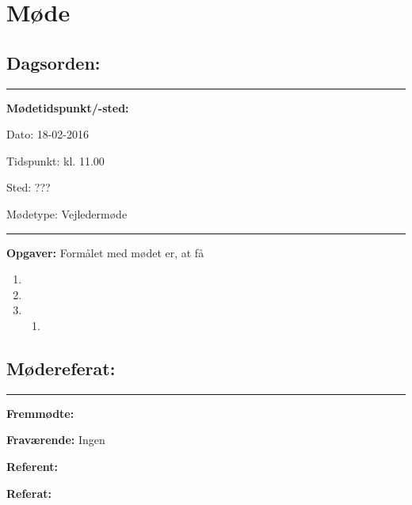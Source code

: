 

\raggedbottom



\frontmatter

\chapter{Møde}

\section{Dagsorden:}

\vspace{0cm}
\hrule
\vspace{0.5cm}

\textbf{Mødetidspunkt/-sted:}

Dato: \tabto{7em} 18-02-2016

Tidspunkt: \tabto{7em} kl. 11.00

Sted: \tabto{7em} ???

Mødetype: \tabto{7em} Vejledermøde

\vspace{0.5cm}
\hrule
\vspace{0.5cm}

\textbf{Opgaver:} \newline
Formålet med mødet er, at få 
\begin{enumerate}
\item 

\item 

\item 
\begin{enumerate}
\item 
\end{enumerate}
\end{enumerate}

\newpage

\section{Mødereferat:}

\vspace{0cm}
\hrule
\vspace{0.5cm}

\textbf{Fremmødte:}

\textbf{Fraværende:} Ingen

\textbf{Referent:}

\textbf{Referat:}

